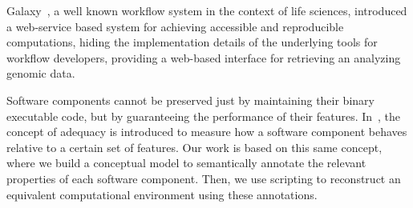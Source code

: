 

Galaxy~\cite{goecks2010galaxy}, a well known workflow system in the context of life sciences, introduced a web-service based system for achieving accessible and reproducible computations, hiding the implementation details of the underlying tools for workflow developers, providing a web-based interface for retrieving an analyzing genomic data. 





Software components cannot be preserved just by maintaining their binary executable code, but by guaranteeing the performance of their features. In~\cite{Matthews}, the concept of adequacy is introduced to measure how a software component behaves relative to a certain set of features. Our work is based on this same concept, where we build a conceptual model to semantically annotate the relevant properties of each software component. Then, we use scripting to reconstruct an equivalent computational environment using these annotations.

